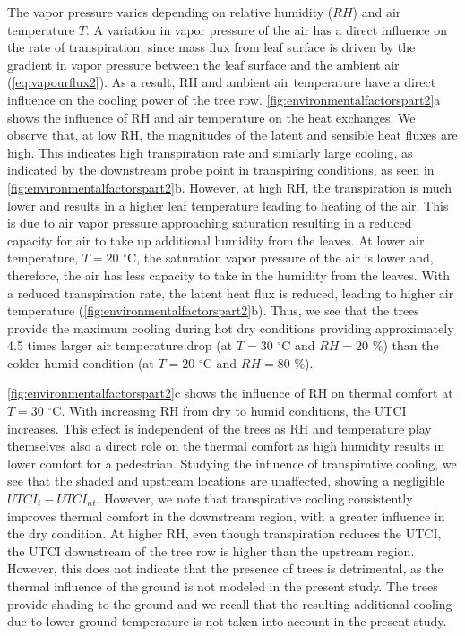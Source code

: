 The vapor pressure varies depending on relative humidity ($RH$) and air temperature $T$. A variation in vapor pressure of the air has a direct influence on the rate of transpiration, since mass flux from leaf surface is driven by the gradient in vapor pressure between the leaf surface and the ambient air (\cref{eq:vapourflux2}). As a result, RH and ambient air temperature have a direct influence on the cooling power of the tree row. \cref{fig:environmentalfactorspart2}a shows the influence of RH and air temperature on the heat exchanges. We observe that, at low RH, the magnitudes of the latent and sensible heat fluxes are high. This indicates high transpiration rate and similarly large cooling, as indicated by the downstream probe point in transpiring conditions, as seen in \cref{fig:environmentalfactorspart2}b. However, at high RH, the transpiration is much lower and results in a higher leaf temperature leading to heating of the air. This is due to air vapor pressure approaching saturation resulting in a reduced capacity for air to take up additional humidity from the leaves. At lower air temperature, $T=20$ $^{\circ}$C, the saturation vapor pressure of the air is lower and, therefore, the air has less capacity to take in the humidity from the leaves. With a reduced transpiration rate, the latent heat flux is reduced, leading to higher air temperature (\cref{fig:environmentalfactorspart2}b). Thus, we see that the trees provide the maximum cooling during hot dry conditions providing approximately 4.5 times larger air temperature drop (at $T=30$ $^{\circ}$C and $\textit{RH}=20$ \%) than the colder humid condition (at $T=20$ $^{\circ}$C and $RH=80$ \%).

\cref{fig:environmentalfactorspart2}c shows the influence of RH on thermal comfort at $T=30$ $^{\circ}$C. With increasing RH from dry to humid conditions, the UTCI increases. This effect is independent of the trees as RH and temperature play themselves also a direct role on the thermal comfort as high humidity results in lower comfort for a pedestrian. Studying the influence of transpirative cooling, we see that the shaded and upstream locations are unaffected, showing a negligible $\textit{UTCI}_t-\textit{UTCI}_{\textit{nt}}$. However, we note that transpirative cooling consistently improves thermal comfort in the downstream region, with a greater influence in the dry condition. At higher RH, even though transpiration reduces the UTCI, the UTCI downstream of the tree row is higher than the upstream region. However, this does not indicate that the presence of trees is detrimental, as the thermal influence of the ground is not modeled in the present study. The trees provide shading to the ground and we recall that the resulting additional cooling due to lower ground temperature is not taken into account in the present study. 

